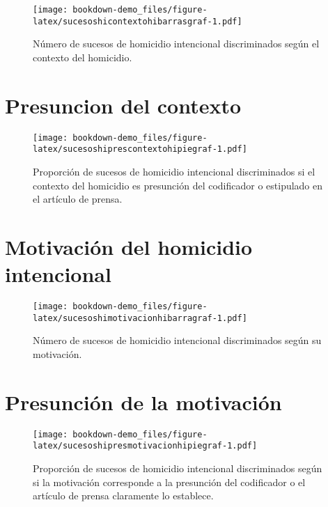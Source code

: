\documentclass[
]{book}
\begin{document}
\begin{figure}
\centering
\texttt{[image: bookdown-demo\_files/figure-latex/sucesoshicontextohibarrasgraf-1.pdf]}
\caption{\label{fig:sucesoshicontextohibarrasgraf}Número de sucesos de homicidio intencional discriminados según el contexto del homicidio.}
\end{figure}

\hypertarget{presuncion-del-contexto}{%
\section{Presuncion del contexto}\label{presuncion-del-contexto}}



\begin{figure}
\centering
\texttt{[image: bookdown-demo\_files/figure-latex/sucesoshiprescontextohipiegraf-1.pdf]}
\caption{\label{fig:sucesoshiprescontextohipiegraf}Proporción de sucesos de homicidio intencional discriminados si el contexto del homicidio es presunción del codificador o estipulado en el artículo de prensa.}
\end{figure}

\hypertarget{motivaciuxf3n-del-homicidio-intencional}{%
\section{Motivación del homicidio intencional}\label{motivaciuxf3n-del-homicidio-intencional}}



\begin{figure}
\centering
\texttt{[image: bookdown-demo\_files/figure-latex/sucesoshimotivacionhibarragraf-1.pdf]}
\caption{\label{fig:sucesoshimotivacionhibarragraf}Número de sucesos de homicidio intencional discriminados según su motivación.}
\end{figure}

\hypertarget{presunciuxf3n-de-la-motivaciuxf3n}{%
\section{Presunción de la motivación}\label{presunciuxf3n-de-la-motivaciuxf3n}}



\begin{figure}
\centering
\texttt{[image: bookdown-demo\_files/figure-latex/sucesoshipresmotivacionhipiegraf-1.pdf]}
\caption{\label{fig:sucesoshipresmotivacionhipiegraf}Proporción de sucesos de homicidio intencional discriminados según si la motivación corresponde a la presunción del codificador o el artículo de prensa claramente lo establece.}
\end{figure}
\end{document}
